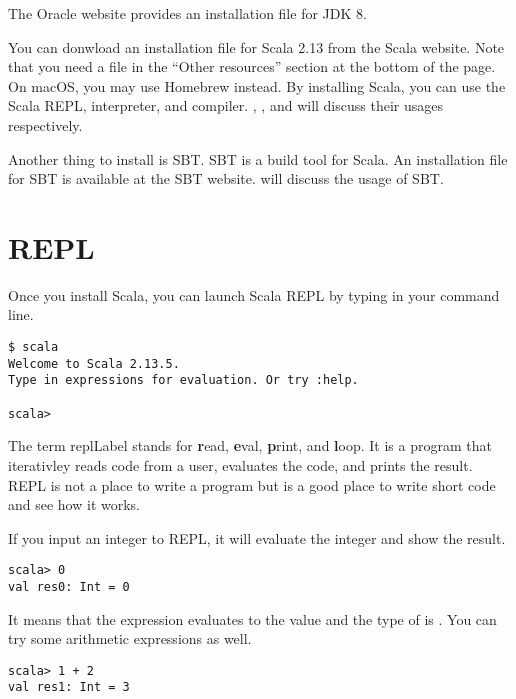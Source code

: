 The Oracle website
provides an installation file for JDK 8.

You can donwload an installation file for Scala 2.13 from the Scala
website. Note that you need a
file in the ``Other resources'' section at the bottom of the page.
On macOS, you may use Homebrew instead. By installing Scala, you can use the
Scala REPL, interpreter, and compiler. ,
, and  will discuss
their usages respectively.

Another thing to install is SBT. SBT is a build tool for Scala. An installation
file for SBT is available at the SBT
website.
 will discuss the usage of SBT.

\section{REPL}

Once you install Scala, you can launch Scala REPL by typing  in
your command line.

\begin{verbatim}
$ scala
Welcome to Scala 2.13.5.
Type in expressions for evaluation. Or try :help.

scala>
\end{verbatim}

The term \acrshort{replLabel} stands for \textbf{r}ead, \textbf{e}val, \textbf{p}rint, and
\textbf{l}oop.
It is a program that iterativley reads code from a user, evaluates the code,
and prints the result. REPL is not a place to write a program but is a good
place to write short code and see how it works.

If you input an integer to REPL, it will evaluate the integer and show the
result.

\begin{verbatim}
scala> 0
val res0: Int = 0
\end{verbatim}

It means that the expression  evaluates to the value  and the type of
 is .
You can try some arithmetic expressions as well.

\begin{verbatim}
scala> 1 + 2
val res1: Int = 3
\end{verbatim}

